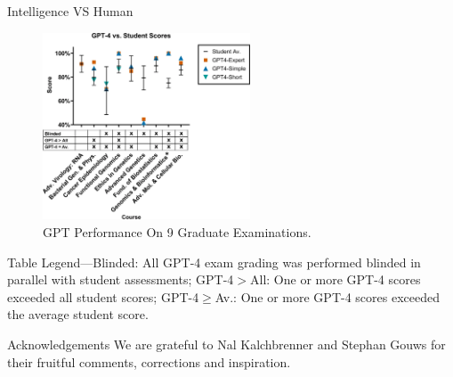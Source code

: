 \documentclass[final,t]{beamer}
\begin{document}
\begin{frame}[fragile]{}
\begin{columns}[t]
\begin{column}{.3\linewidth}
	\begin{block}{Intelligence VS Human}
	\begin{figure}
		\centering
		\includegraphics[width=0.55\textwidth]{figures/GPTvsHuman.png}
		\caption{GPT Performance On 9 Graduate Examinations.}
	\end{figure}
	Table Legend—Blinded: All GPT-4 exam grading was performed blinded in parallel with student assessments; GPT-4$>$All: One or more GPT-4 scores exceeded all student scores; GPT-4$\geq$Av.: One or more GPT-4 scores exceeded the average student score. 

	\end{block}
	\begin{block}{Acknowledgements}
		We are grateful to Nal Kalchbrenner and Stephan Gouws for
		their fruitful comments, corrections and inspiration.
	\end{block}

    \end{column}
  \end{columns}
\end{frame}
\end{document}

